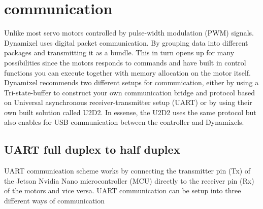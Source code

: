 \section*{communication}
Unlike most servo motors controlled by pulse-width modulation (PWM) signals.
Dynamixel uses digital packet communication.
By grouping data into different packages and transmitting it as a bundle.
This in turn opens up for many possibilities since the motors responds to commands and have built in control functions you can execute together with memory allocation on the motor itself.
Dynamixel recommends two different setups for communication,
either by using a Tri-state-buffer to construct your own communication bridge and protocol based on Universal asynchronous receiver-transmitter setup (UART) or by using their own built solution called U2D2.
In essense, the U2D2 uses the same protocol but also enables for USB communication between the controller and Dynamixels\cite{robotis}.

\subsection{UART full duplex to half duplex}
UART communication scheme works by connecting the transmitter pin (Tx) of the Jetson Nvidia Nano microcontroller (MCU)
directly to the receiver pin (Rx) of the motors and vice versa.
UART communication can be setup into three different ways of communication \cite{duplex}


